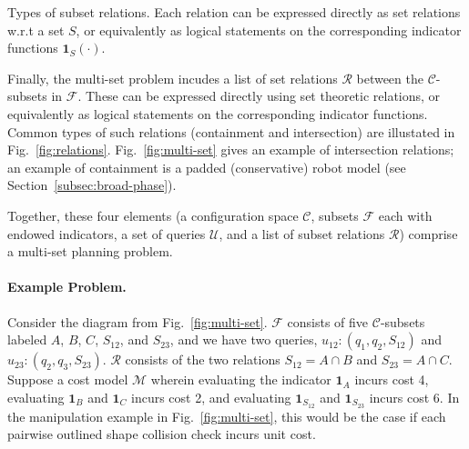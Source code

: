 \begin{marginfigure}
   \centering
   \vspace{-0.05in}
   \vspace{0.1in}
   \caption{Types of subset relations.
     Each relation can be expressed directly as set relations
     w.r.t a set $S$,
     or equivalently as logical statements
     on the corresponding indicator functions
     $\mathbf{1}_S(\cdot)$.}
   \label{fig:relations}
\end{marginfigure}

Finally, the multi-set problem incudes a list of set relations
$\mathcal{R}$
between the $\mathcal{C}$-subsets in $\mathcal{F}$.
These can be expressed directly using set theoretic relations,
or equivalently as logical statements
on the corresponding indicator functions.
Common types of such relations
(containment and intersection)
are illustated in Fig.~\ref{fig:relations}.
Fig.~\ref{fig:multi-set} gives an example of intersection relations;
an example of containment is a padded (conservative)
robot model (see Section~\ref{subsec:broad-phase}).

Together, these four elements
(a configuration space $\mathcal{C}$,
subsets $\mathcal{F}$ each with endowed indicators,
a set of queries $\mathcal{U}$,
and a list of subset relations $\mathcal{R}$)
comprise a multi-set planning problem.

\paragraph{Example Problem.}
Consider the diagram from Fig.~\ref{fig:multi-set}.
$\mathcal{F}$ consists of five $\mathcal{C}$-subsets labeled
$A$, $B$, $C$, $S_{12}$, and $S_{23}$,
and we have two queries,
$u_{12}: (q_1, q_2, S_{12})$
and
$u_{23}: (q_2, q_3, S_{23})$.
$\mathcal{R}$ consists of the two relations
$S_{12} = A \cap B$ and $S_{23} = A \cap C$.
Suppose a cost model $\mathcal{M}$
wherein evaluating the indicator
$\mathbf{1}_A$ incurs cost 4,
evaluating $\mathbf{1}_B$ and $\mathbf{1}_C$ incurs cost 2,
and evaluating $\mathbf{1}_{S_{12}}$ and $\mathbf{1}_{S_{23}}$
incurs cost 6.
In the manipulation example in
Fig.~\ref{fig:multi-set},
this would be the case if each
pairwise outlined shape collision check incurs unit cost.

